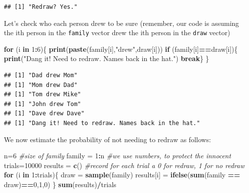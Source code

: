 \documentclass[
]{book}
\newenvironment{Shaded}{\begin{snugshade}}{\end{snugshade}}
\newcommand{\CommentTok}[1]{\textcolor[rgb]{0.56,0.35,0.01}{\textit{#1}}}
\newcommand{\ControlFlowTok}[1]{\textcolor[rgb]{0.13,0.29,0.53}{\textbf{#1}}}
\newcommand{\DecValTok}[1]{\textcolor[rgb]{0.00,0.00,0.81}{#1}}
\newcommand{\FunctionTok}[1]{\textcolor[rgb]{0.13,0.29,0.53}{\textbf{#1}}}
\newcommand{\NormalTok}[1]{#1}
\newcommand{\OtherTok}[1]{\textcolor[rgb]{0.56,0.35,0.01}{#1}}
\newcommand{\SpecialCharTok}[1]{\textcolor[rgb]{0.81,0.36,0.00}{\textbf{#1}}}
\newcommand{\StringTok}[1]{\textcolor[rgb]{0.31,0.60,0.02}{#1}}
\theoremstyle{definition}
\theoremstyle{definition}
\theoremstyle{definition}
\theoremstyle{definition}
\theoremstyle{remark}
\begin{document}
\begin{verbatim}
## [1] "Redraw? Yes."
\end{verbatim}

Let's check who each person drew to be sure (remember, our code is assuming the ith person in the \texttt{family} vector drew the ith person in the \texttt{draw} vector)

\begin{Shaded}
\begin{Highlighting}[]
\ControlFlowTok{for}\NormalTok{ (i }\ControlFlowTok{in} \DecValTok{1}\SpecialCharTok{:}\DecValTok{6}\NormalTok{)\{}
  \FunctionTok{print}\NormalTok{(}\FunctionTok{paste}\NormalTok{(family[i],}\StringTok{"drew"}\NormalTok{,draw[i]))}
  \ControlFlowTok{if}\NormalTok{ (family[i]}\SpecialCharTok{==}\NormalTok{draw[i])\{}
    \FunctionTok{print}\NormalTok{(}\StringTok{"Dang it! Need to redraw. Names back in the hat."}\NormalTok{) }
    \ControlFlowTok{break}\NormalTok{\}}
\NormalTok{\}}
\end{Highlighting}
\end{Shaded}

\begin{verbatim}
## [1] "Dad drew Mom"
## [1] "Mom drew Dad"
## [1] "Tom drew Mike"
## [1] "John drew Tom"
## [1] "Dave drew Dave"
## [1] "Dang it! Need to redraw. Names back in the hat."
\end{verbatim}

We now estimate the probability of not needing to redraw as follows:

\begin{Shaded}
\begin{Highlighting}[]
\NormalTok{n}\OtherTok{=}\DecValTok{6} \CommentTok{\#size of family}
\NormalTok{family }\OtherTok{=} \DecValTok{1}\SpecialCharTok{:}\NormalTok{n }\CommentTok{\#we use numbers, to protect the innocent}
\NormalTok{trials}\OtherTok{=}\DecValTok{10000}
\NormalTok{results }\OtherTok{=} \FunctionTok{c}\NormalTok{() }\CommentTok{\#record for each trial a 0 for redraw, 1 for no redraw }
\ControlFlowTok{for}\NormalTok{ (i }\ControlFlowTok{in} \DecValTok{1}\SpecialCharTok{:}\NormalTok{trials)\{}
\NormalTok{  draw }\OtherTok{=} \FunctionTok{sample}\NormalTok{(family)}
\NormalTok{  results[i] }\OtherTok{=} \FunctionTok{ifelse}\NormalTok{(}\FunctionTok{sum}\NormalTok{(family }\SpecialCharTok{==}\NormalTok{ draw)}\SpecialCharTok{==}\DecValTok{0}\NormalTok{,}\DecValTok{1}\NormalTok{,}\DecValTok{0}\NormalTok{)}
\NormalTok{\}}
\FunctionTok{sum}\NormalTok{(results)}\SpecialCharTok{/}\NormalTok{trials}
\end{Highlighting}
\end{Shaded}
\end{document}
